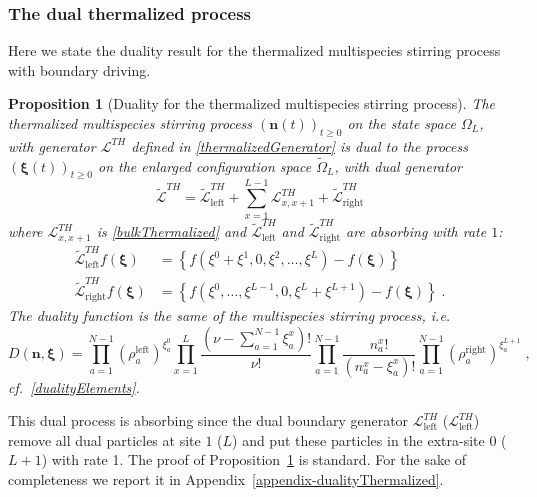 \documentclass[10pt]{article}
\numberwithin{equation}{section}
\numberwithin{equation}{subsection}
\newtheorem{proposition}{Proposition}
\newcommand{\co}{\;,}
\newcommand{\dt}{\;.}
\begin{document}
\subsubsection{The dual thermalized process}\label{subsection-dualTHM}
Here we state the duality result for the thermalized multispecies stirring process with boundary driving.
\begin{proposition}[Duality for the thermalized multispecies stirring process]\label{proposition-dualityTHM}
The thermalized multispecies stirring process $(\bm{n}(t))_{t\geq 0}$ on the state space $\Omega_{L}$, with generator $\mathcal{L}^{TH}$ defined in \eqref{thermalizedGenerator} is dual to the process $(\bm{\xi}(t))_{t\geq 0}$ on the enlarged configuration space $\widetilde{\Omega}_{L}$, with dual generator
\begin{equation}
	\widetilde{\mathcal{L}}^{TH}=\widetilde{\mathcal{L}}_{\text{left}}^{TH}+\sum_{x=1}^{L-1}\mathcal{L}_{x,x+1}^{TH}+\widetilde{\mathcal{L}}_{\text{right}}^{TH}
\end{equation}
where $\mathcal{L}^{TH}_{x,x+1}$ is \eqref{bulkThermalized} and $\widetilde{\mathcal{L}}_{\text{left}}^{TH}$ and $\widetilde{\mathcal{L}}_{\text{right}}^{TH}$ are absorbing with rate $1$:
\begin{align}
	\widetilde{\mathcal{L}}_{\text{left}}^{TH}f(\bm{\xi})&=\left\{f(\xi^{0}+\xi^{1},0,\xi^{2},\ldots,\xi^{L})-f(\bm{\xi})\right\}\nonumber\\ \widetilde{\mathcal{L}}_{\text{right}}^{TH}f(\bm{\xi})&=\left\{f(\xi^{0},\ldots,\xi^{L-1},0,\xi^{L}+\xi^{L+1})-f(\bm{\xi})\right\}\dt
\end{align}
The duality function is the same of the multispecies stirring process, i.e. 
\begin{equation}
	D(\bm{n},\bm{\xi})=\prod_{a=1}^{N-1}\left(\rho_{a}^{\text{left}}\right)^{\xi_{a}^{0}}\prod_{x=1}^{L}\frac{(\nu-\sum_{a=1}^{N-1}\xi_{a}^{x})!}{\nu!}\prod_{a=1}^{N-1}\frac{n_{a}^{x}!}{(n_{a}^{x}-\xi_{a}^{x})!}\prod_{a=1}^{N-1}\left(\rho_{a}^{\text{right}}\right)^{\xi_{a}^{L+1}}\co
\end{equation}
cf.~\eqref{dualityElements}.
\end{proposition}
This dual process is absorbing since the dual boundary generator $\mathcal{L}_{\text{left}}^{TH}$ ($\mathcal{L}_{\text{left}}^{TH}$) remove all dual particles at site $1$ ($L$) and put these particles in the extra-site $0$ ($L+1$) with rate 1.
The proof of Proposition~\ref{proposition-dualityTHM} is standard. For the sake of completeness we report it in Appendix~\ref{appendix-dualityThermalized}.
\end{document}
